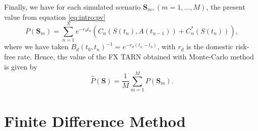 Finally, we have for each simulated scenario $\mathbf{S}_m, (m=1,\ldots,M)$, the present value from equation \eqref{eq:intro:pv}
$$P(\mathbf{S}_m) = \sum_{n=1}^{N}e^{-r_d t_n}\left(C_n(S(t_n),A(t_{n-1}))+C^\ast_n(S(t_n))\right),$$
where we have taken $B_d(t_0,t_n)^{-1}=e^{-r_d (t_n-t_0)}$, with $r_d$ is the domestic risk-free rate. Hence, the value of the FX TARN obtained with Monte-Carlo method is given by
$$\hat{P}(\mathbf{S})=\frac{1}{M}\sum_{m=1}^M P(\mathbf{S}_m).$$

\section{Finite Difference Method}
\label{sec:methods:FD}




